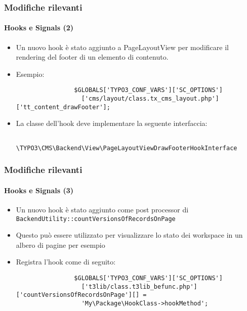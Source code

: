 \begin{frame}[fragile]
	\frametitle{Modifiche rilevanti}
	\framesubtitle{Hooks e Signals (2)}

	\begin{itemize}

		\item Un nuovo hook è stato aggiunto a PageLayoutView per modificare il rendering
			del footer di un elemento di contenuto.

		\item Esempio:
			\begin{lstlisting}
				$GLOBALS['TYPO3_CONF_VARS']['SC_OPTIONS']
				  ['cms/layout/class.tx_cms_layout.php']['tt_content_drawFooter'];
			\end{lstlisting}

		\item La classe dell'hook deve implementare la seguente interfaccia:
			\begin{lstlisting}
				\TYPO3\CMS\Backend\View\PageLayoutViewDrawFooterHookInterface
			\end{lstlisting}

	\end{itemize}

\end{frame}


\begin{frame}[fragile]
	\frametitle{Modifiche rilevanti}
	\framesubtitle{Hooks e Signals (3)}

	\begin{itemize}

		\item Un nuovo hook è stato aggiunto come post processor di
			\small
				\texttt{BackendUtility::countVersionsOfRecordsOnPage}
			\normalsize

		\item Questo può essere utilizzato per visualizzare lo stato dei workspace in un albero di pagine per esempio
		\item Registra l'hook come di seguito:

			\begin{lstlisting}
				$GLOBALS['TYPO3_CONF_VARS']['SC_OPTIONS']
				  ['t3lib/class.t3lib_befunc.php']['countVersionsOfRecordsOnPage'][] =
				  'My\Package\HookClass->hookMethod';
			\end{lstlisting}

	\end{itemize}

\end{frame}

